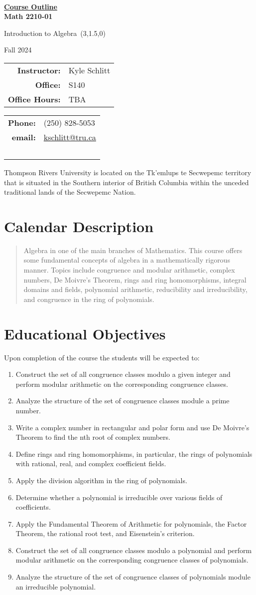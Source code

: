 \documentclass[10pt]{trumathoutline}
\makeatletter
\newcommand{\instructorname}     {Kyle Schlitt}
\newcommand{\instructorphone}    {(250) 828-5053}
\newcommand{\instructoremail}    {kschlitt@tru.ca}
\newcommand{\instructorofficehrs}{TBA}
\newcommand{\instructorofficerm} {S140}
\newcommand{\coursecode}     	 {Math 2210-01}
\newcommand{\coursetitle}    	 {Introduction to Algebra}
\newcommand{\coursevectoring}	 {(3,1.5,0)}
\newcommand{\term}           	 {Fall 2024}
\newcommand{\calendardescription}{Algebra in one of the main branches of Mathematics. This course offers some fundamental concepts of algebra in a mathematically rigorous manner. Topics include congruence and modular arithmetic, complex numbers, De Moivre’s Theorem, rings and ring homomorphisms, integral domains and fields, polynomial arithmetic, reducibility and irreducibility, and congruence in the ring of polynomials.
}
\newcommand{\coursedescription}{
}
\newcommand{\courseobjectives}{
	\begin{enumerate}
		\item Construct the set of all congruence classes modulo a given integer and perform modular arithmetic on the corresponding congruence classes.
		\item Analyze the structure of the set of congruence classes module a prime number.
		\item	Write a complex number in rectangular and polar form and use De Moivre’s Theorem to find the nth root of complex numbers.
		\item Define rings and ring homomorphisms, in particular, the rings of polynomials with rational, real, and complex coefficient fields.
		\item Apply the division algorithm in the ring of polynomials.
		\item Determine whether a polynomial is irreducible over various fields of coefficients.
		\item Apply the Fundamental Theorem of Arithmetic for polynomials, the Factor Theorem, the rational root test, and Eisenstein’s criterion.
		\item Construct the set of all congruence classes modulo a polynomial and perform modular arithmetic on the corresponding congruence classes of polynomials.
		\item Analyze the structure of the set of congruence classes of polynomials module an irreducible polynomial.
	\end{enumerate}
}
\makeatother
\begin{document}
	
	~
	
	\vspace{-1em}
	
	\begin{center}
		\bfseries
		{\Large \underline{Course Outline}}\\[0.5em]
		
		\coursecode
		
		\coursetitle\ \coursevectoring
		
		\term
		
	\end{center}
\begin{tabular}{ r l}
	\textbf{Instructor:}	& \instructorname 	\\
	\textbf{Office:} 		& \instructorofficerm \\
	\textbf{Office Hours:} 	& \instructorofficehrs
\end{tabular}\hfill
\begin{tabular}{ r l}
	 \textbf{Phone:} & \instructorphone\\
	 \textbf{email:} & \href{mailto:\instructoremail}{\instructoremail}\\
	~
\end{tabular}

\vspace{1em}


Thompson Rivers University is located on the Tk’emlups te Secwepemc territory that is situated in the Southern interior of British Columbia within the unceded traditional lands of the Secwepemc Nation.

\section*{Calendar Description}
\begin{quote}
	\calendardescription
\end{quote}
	


\section*{Educational Objectives}
Upon completion of the course the students will be expected to:
\courseobjectives
\end{document}
